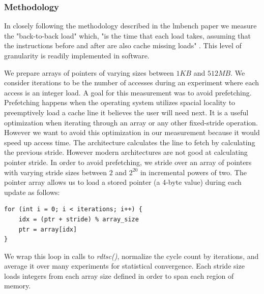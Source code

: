 \documentclass[sigconf]{acmart}
\begin{document}
\subsubsection{Methodology}
In closely following the methodology described in the lmbench paper we measure the "back-to-back load" which, "is the time that each load takes, assuming that the instructions before and after are also cache missing loads" \cite{lmbench}. This level of granularity is readily implemented in software.

We prepare arrays of pointers of varying sizes between $1KB$ and $512MB$. We consider iterations to be the number of accesses during an experiment where each access is an integer load. A goal for this measurement was to avoid prefetching. Prefetching happens when the operating system utilizes spacial locality to preemptively load a cache line it believes the user will need next. It is a useful optimization when iterating through an array or any other fixed-stride operation. However we want to avoid this optimization in our measurement because it would speed up access time. The architecture calculates the line to fetch by calculating the previous stride. However modern architectures are not good at calculating pointer stride. In order to avoid prefetching, we stride over an array of pointers with varying stride sizes between $2$ and $2^{20}$ in incremental powers of two. The pointer array allows us to load a stored pointer (a 4-byte value) during each update as follows:

\begin{lstlisting}
for (int i = 0; i < iterations; i++) {
	idx = (ptr + stride) % array_size
	ptr = array[idx]
}
\end{lstlisting}

We wrap this loop in calls to \textit{rdtsc()}, normalize the cycle count by iterations, and average it over many experiments for statistical convergence. Each stride size loads integers from each array size defined in order to span each region of memory.
\end{document}
